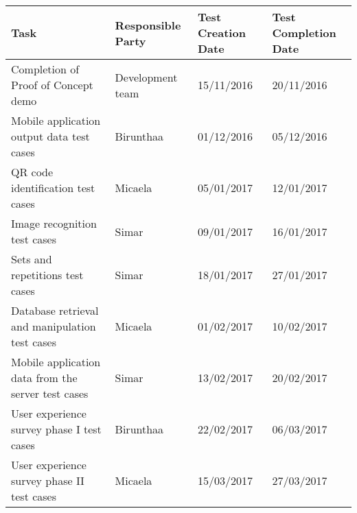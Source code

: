 \documentclass{article}
\begin{document}
\begingroup
\begin{center}
\begin{tabular}{p{5cm} p{2cm} p{3cm} p{3cm}}
    \hline
    \textbf{Task} & \textbf{Responsible Party} & \textbf{Test Creation Date} & \textbf{Test Completion Date}\\
    \hline
    Completion of Proof of Concept demo & Development team & 15/11/2016 & 20/11/2016 \\

    Mobile application output data  test cases & Birunthaa & 01/12/2016 & 05/12/2016 \\

    QR code identification test cases & Micaela & 05/01/2017 & 12/01/2017 \\

    Image recognition test cases & Simar & 09/01/2017 & 16/01/2017 \\
    
    Sets and repetitions test cases & Simar & 18/01/2017 & 27/01/2017 \\

    Database retrieval and manipulation test cases & Micaela & 01/02/2017 & 10/02/2017\\

    Mobile application data from the server  test cases & Simar & 13/02/2017 & 20/02/2017\\
 
    User experience survey phase I test cases & Birunthaa & 22/02/2017 & 06/03/2017 \\

    User experience survey phase II test cases & Micaela & 15/03/2017 & 27/03/2017 \\
    \hline
\end{tabular}
\end{center}
\endgroup
\end{document}
